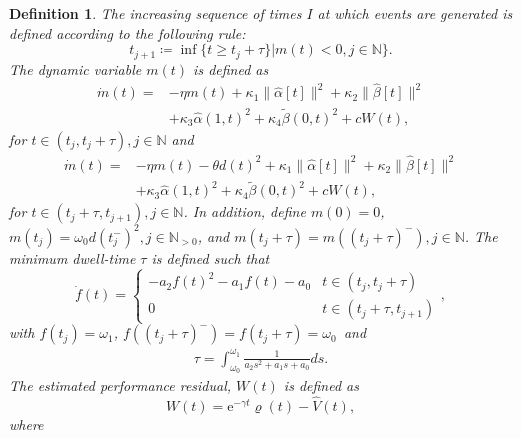 \documentclass[10pt,a4paper]{amsart}
\newtheorem{definition}{Definition}
\begin{document}
\begin{definition}\label{def:etc}
The increasing sequence of times $I$ at which events are generated is defined according to the following rule:
\begin{equation}
    t_{j+1}\coloneqq \inf\{t\geq t_j + \tau\}\vert m(t)<0, j\in\mathbb{N}\}.\label{tj+1}
\end{equation}
    The dynamic variable $m(t)$ is defined as
    \begin{equation}
    \begin{aligned}
        \dot m(t) =& -\eta m(t) + \kappa_1\|\hat \alpha[t]\|^2 + \kappa_2 \|\hat \beta[t]\|^2\\&  + \kappa_3 \hat\alpha(1,t)^2+ \kappa_4 \tilde \beta(0,t)^2 + cW(t),\label{m1}
    \end{aligned}
    \end{equation}
    for $t\in(t_j,t_j+\tau),j\in\mathbb{N}$ and
    \begin{equation}
    \begin{aligned}
        \dot m(t) =& -\eta m(t) -\theta d(t)^2 + \kappa_1 \|\hat \alpha[t]\|^2 + \kappa_2 \|\hat \beta[t]\|^2\\&  + \kappa_3 \hat\alpha(1,t)^2+ \kappa_4 \tilde \beta(0,t)^2 + cW(t),\label{m2}
    \end{aligned}
    \end{equation}
    for $t\in(t_j+\tau,t_{j+1}),j\in\mathbb{N}$. In addition, define $m(0)=0$, $m(t_j)=\omega_0d(t_j^-)^2,j\in\mathbb{N}_{>0}$, and $m(t_j+\tau)=m((t_j+\tau)^-),j\in\mathbb{N}$. The minimum dwell-time $\tau$ is defined such that
    \begin{equation}\label{f}
    \dot f(t) =
        \begin{cases}
            -a_2f(t)^2 - a_1f(t) - a_0&t\in(t_j,t_j+\tau)\\
            0&t\in(t_j+\tau,t_{j+1})
        \end{cases},
    \end{equation}
    with $f(t_j)=\omega_1$, $f((t_j+\tau)^-)=f(t_j+\tau)=\omega_0$\, and 
    \begin{align}
        \tau = \int_{\omega_0}^{\omega_1}\frac{1}{a_2s^2 + a_1s + a_0}ds.\label{tau}
    \end{align}The estimated performance residual, $W(t)$ is defined as
    \begin{equation}
        W(t) = \mathrm{e}^{-\gamma t}\varrho(t) - \hat V(t),\label{w}
    \end{equation}
    where
    \begin{align}

\end{align}
\end{definition}
\end{document}

